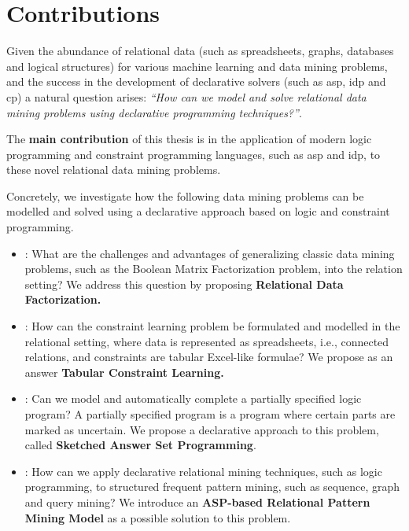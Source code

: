 \section{Contributions}\label{sec:contributions}
Given the abundance of relational data (such as spreadsheets, graphs,
databases and logical structures) for various machine learning and data
mining problems, and the success in the development of declarative solvers (such
as \acrshort{asp}, \acrshort{idp} and \acrshort{cp}) a
natural question arises: \textit{``How can we model and
solve relational data mining problems using declarative programming
techniques?''}. 

The \textbf{main contribution} of this thesis is in the application of
modern logic programming and constraint programming languages, such as \acrshort{asp} and
\acrshort{idp}, to these novel relational data mining problems.


Concretely, we investigate how the following data mining problems
can be modelled and solved using a declarative approach based on
logic and constraint programming.
\pubrev
\begin{itemize}
    \item \cone: What are the challenges and advantages of generalizing
    classic data mining problems, such as the Boolean Matrix
    Factorization problem, into the relation setting? We address this
        question by proposing \textbf{Relational Data Factorization.}
  \item \ctwo: How can the constraint learning problem be formulated
   and modelled in the relational setting, where data is
   represented as spreadsheets, i.e., connected relations, and constraints are
   tabular Excel-like formulae? We propose as an answer \textbf{Tabular Constraint Learning.} 
  \item \cthree: Can we model and automatically complete a partially specified logic program?
      A partially specified program is a program where certain
        parts are marked as uncertain. We propose a declarative approach to
        this problem, called \textbf{Sketched Answer Set Programming}.
   \item \cfour:
    How can we apply declarative relational mining
    techniques, such as logic programming, to structured frequent pattern mining, such as sequence, graph
    and query mining? We introduce an \textbf{ASP-based Relational
        Pattern Mining Model} as a possible solution to this problem.
\end{itemize}
\pubrevend

